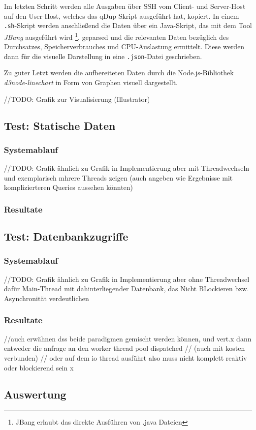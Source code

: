   Im letzten Schritt werden alle Ausgaben über SSH vom Client- und Server-Host auf den User-Host, welches das qDup Skript ausgeführt hat, kopiert.
  In einem \verb|.sh|-Skript werden anschließend die Daten über ein Java-Skript, das mit dem Tool \textit{JBang} ausgeführt 
  wird \footnote{JBang erlaubt das direkte Ausführen von .java Dateien},
   geparsed und die relevanten Daten bezüglich des Durchsatzes, Speicherverbrauches und CPU-Auslastung ermittelt.
  Diese werden dann für die visuelle Darstellung in eine \verb|.json|-Datei geschrieben.

  Zu guter Letzt werden die aufbereiteten Daten durch die Node.js-Bibliothek \textit{d3node-linechart} in Form von Graphen visuell dargestellt.
  
    //TODO: Grafik zur Visualisierung (Illustrator)
\subsection{Test: Statische Daten}
\label{section:statische_daten}

\subsubsection{Systemablauf}
//TODO: Grafik ähnlich zu Grafik in Implementierung aber mit Threadwechseln und exemplarisch mhrere Threads zeigen
(auch angeben wie Ergebnisse mit komplizierteren Queries aussehen könnten)
\subsubsection{Resultate}

\subsection{Test: Datenbankzugriffe}
\label{section:datenbankzugriffe}

\subsubsection{Systemablauf}
//TODO: Grafik ähnlich zu Grafik in Implementierung aber ohne Threadwechsel dafür Main-Thread mit dahinterliegender Datenbank,
das Nicht BLockieren bzw. Asynchronität verdeutlichen

\subsubsection{Resultate}

//auch erwähnen dss beide paradigmen gemischt werden können, und vert.x dann entweder die anfrage an den worker thread pool dispatched
// (auch mit kosten verbunden)
// oder auf dem io thread ausführt also muss nicht komplett reaktiv oder blockierend sein x
\subsection{Auswertung}

\label{section:auswertung}